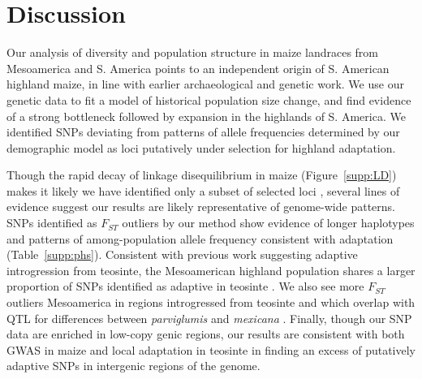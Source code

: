  \section*{Discussion}

Our analysis of diversity and population structure in maize landraces from Mesoamerica and S. America points to an independent origin of S. American highland maize, in line with earlier archaeological \cite[]{Piperno_2006_69,Perry_2006_16511492,Grobman_2012_22307642} and genetic \citep{vanHeerwaarden_2011_21189301} work. 
We use our genetic data to fit a model of historical population size change, and find 
evidence of a strong bottleneck followed by expansion in the highlands of S. America. 
We identified SNPs deviating from patterns of allele frequencies determined by our demographic model as loci putatively under selection for highland adaptation. 

{Though the rapid decay of linkage disequilibrium in maize (Figure~\ref{supp:LD}) makes it likely we have identified only a subset of selected loci \cite[]{tiffin2014advances}, several lines of evidence suggest our results are likely representative of genome-wide patterns. SNPs identified as $F_{ST}$ outliers by our method show evidence of longer haplotypes and patterns of among-population allele frequency consistent with adaptation (Table~\ref{supp:phs}). 
Consistent with previous work suggesting adaptive introgression from teosinte, the Mesoamerican highland population shares a larger proportion of SNPs identified as adaptive in teosinte \citep{Pyhajarvi2013}.  We also see more $F_{ST}$ outliers Mesoamerica in regions introgressed from teosinte and which overlap with QTL for differences between \emph{parviglumis} and \emph{mexicana} \citep{Lauter_2004_15342532, Profford_2013}.  Finally, though our SNP data are enriched in low-copy genic regions, our results are consistent with both GWAS in maize  \citep{Wallace_2014_25474422} and local adaptation in teosinte \citep{Pyhajarvi2013} in finding an excess of putatively adaptive SNPs in intergenic regions of the genome.}

